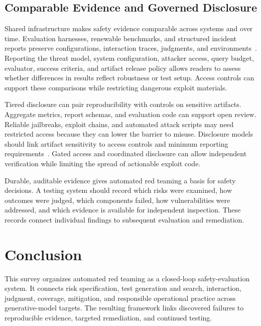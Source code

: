 \documentclass[review]{fcs}
\let\fcsOriginalCite\cite
\renewcommand{\cite}[1]{\allowbreak\fcsOriginalCite{#1}}
\begin{document}
\subsection{Comparable Evidence and Governed Disclosure}
\label{sec:agenda_governance}

Shared infrastructure makes safety evidence comparable across systems and over time. Evaluation harnesses, renewable benchmarks, and structured incident reports preserve configurations, interaction traces, judgments, and environments~\cite{ukaisi2024inspect,zhang2025jbdistill,mcgregor2025toerr,paeth2025lessons,longpre2026flareai}. Reporting the threat model, system configuration, attacker access, query budget, evaluator, success criteria, and artifact release policy allows readers to assess whether differences in results reflect robustness or test setup. Access controls can support these comparisons while restricting dangerous exploit materials.

Tiered disclosure can pair reproducibility with controls on sensitive artifacts. Aggregate metrics, report schemas, and evaluation code can support open review. Reliable jailbreaks, exploit chains, and automated attack scripts may need restricted access because they can lower the barrier to misuse. Disclosure models should link artifact sensitivity to access controls and minimum reporting requirements~\cite{solaiman2019release,fang2024llmagentsautonomouslyhack,cattell2024coordinatedflaw,householder2024lessons}. Gated access and coordinated disclosure can allow independent verification while limiting the spread of actionable exploit code.

Durable, auditable evidence gives automated red teaming a basis for safety decisions. A testing system should record which risks were examined, how outcomes were judged, which components failed, how vulnerabilities were addressed, and which evidence is available for independent inspection. These records connect individual findings to subsequent evaluation and remediation.
\section{Conclusion}

This survey organizes automated red teaming as a closed-loop safety-evaluation system. It connects risk specification, test generation and search, interaction, judgment, coverage, mitigation, and responsible operational practice across generative-model targets. The resulting framework links discovered failures to reproducible evidence, targeted remediation, and continued testing.
\end{document}
